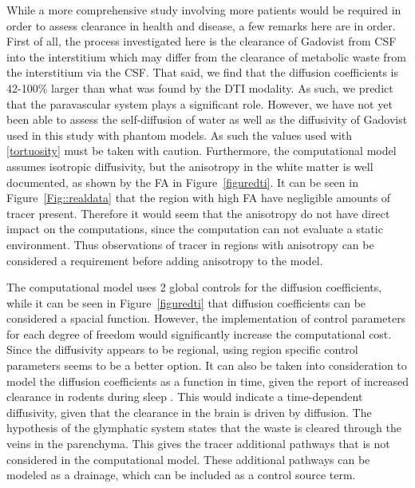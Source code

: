 \documentclass[11pt,a4paper]{article}
\begin{document}
While a more comprehensive study involving more patients would be required in order to assess clearance in health and disease, a few remarks here are in order. 
First of all, the process investigated here is the clearance of Gadovist from CSF into the interstitium which may differ from the clearance of metabolic waste 
from the interstitium via the CSF. That said, 
we find that the diffusion coefficients is 42-100\% larger than what was found by the DTI modality. As such, we predict that the paravascular system 
plays a significant role.  
However, we have not yet been able to assess the self-diffusion of water as well as the diffusivity of Gadovist used in this study with phantom models. As such 
the values used with \eqref{tortuosity} must be taken with caution. Furthermore,    
the computational model assumes isotropic diffusivity, but the anisotropy in the white matter is well documented, as shown by the FA in Figure~\ref{figuredti}. It can be seen in Figure~\ref{Fig::realdata} that the region with high FA have negligible amounts of tracer present. Therefore it would seem that the anisotropy do not have direct impact on the computations, since the computation can not evaluate a static environment. Thus observations of tracer in regions with anisotropy can be considered a requirement before adding anisotropy to the model.

The computational model uses 2 global controls for the diffusion coefficients, while it can be seen in  Figure~\ref{figuredti} that diffusion coefficients can be considered a spacial function. However, the implementation of control parameters for each degree of freedom would significantly increase the computational cost. Since the diffusivity appears to be regional, using region specific control parameters seems to be a better option.
It can also be taken into consideration to model the diffusion coefficients as a function in time, given the report of increased clearance in rodents during sleep \cite{xie2013sleep}. This would indicate a time-dependent diffusivity, given that the clearance in the brain is driven by diffusion. %
The hypothesis of the glymphatic system \cite{iliff2012paravascular} states that the waste is cleared through the veins in the parenchyma. This gives the tracer additional pathways that is not considered in the computational model. These additional pathways can be modeled as a drainage, which can be included as a control source term. 
\end{document}
